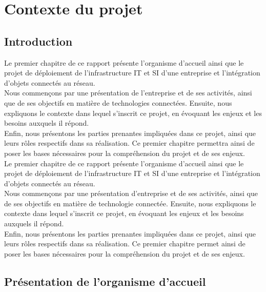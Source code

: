 \chapter{Contexte du projet}


\section{Introduction}
Le premier chapitre de ce rapport présente l'organisme d'accueil ainsi que le projet de déploiement de l'infrastructure IT et SI d'une entreprise et l'intégration d'objets connectés au réseau. \\

Nous commençons  par une présentation de l'entreprise et de ses activités, ainsi que de ses objectifs en matière de technologies connectées. Ensuite, nous expliquons le contexte dans lequel s'inscrit ce projet, en évoquant les enjeux et les besoins auxquels il répond.\\

Enfin, nous présentons  les parties prenantes impliquées dans ce projet, ainsi que leurs rôles respectifs dans sa réalisation. Ce premier chapitre permettra ainsi de poser les bases nécessaires pour la compréhension du projet et de ses enjeux.\\



Le premier chapitre de ce rapport présente l'organisme d'accueil ainsi que le projet de déploiement de l'infrastructure IT et SI d'une entreprise et l'intégration d'objets connectés au réseau. \\

Nous commençons par une présentation d'entreprise et de ses activités, ainsi que de ses objectifs en matière de technologie connectée. Ensuite, nous expliquons le contexte dans lequel s'inscrit ce projet, en évoquant les enjeux et les besoins auxquels il répond.\\
 
Enfin, nous présentons les parties prenantes impliquées dans ce projet, ainsi que leurs rôles respectifs dans sa réalisation. Ce premier chapitre permet ainsi de poser les bases nécessaires pour la compréhension du projet et de ses enjeux. \\


\section{Présentation de l'organisme d'accueil }

